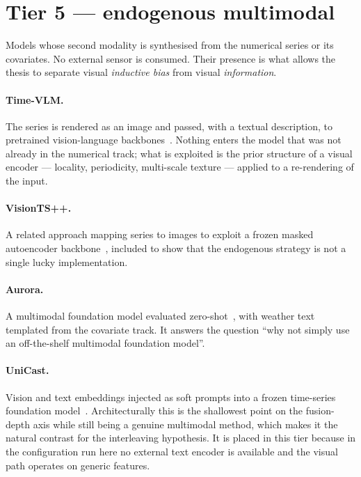 \section{Tier 5 --- endogenous multimodal}
\label{sec:tier5}

Models whose second modality is synthesised from the numerical series or its covariates. No
external sensor is consumed. Their presence is what allows the thesis to separate visual
\emph{inductive bias} from visual \emph{information}.

\paragraph{Time-VLM.} The series is rendered as an image and passed, with a textual
description, to pretrained vision-language backbones~\cite{timevlm}. Nothing enters the
model that was not already in the numerical track; what is exploited is the prior structure
of a visual encoder --- locality, periodicity, multi-scale texture --- applied to a
re-rendering of the input.

\paragraph{VisionTS++.} A related approach mapping series to images to exploit a frozen
masked autoencoder backbone~\cite{visiontspp}, included to show that the endogenous strategy
is not a single lucky implementation.

\paragraph{Aurora.} A multimodal foundation model evaluated zero-shot~\cite{aurora}, with
weather text templated from the covariate track. It answers the question ``why not simply use
an off-the-shelf multimodal foundation model''.

\paragraph{UniCast.} Vision and text embeddings injected as soft prompts into a frozen
time-series foundation model~\cite{unicast}. Architecturally this is the shallowest point on
the fusion-depth axis while still being a genuine multimodal method, which makes it the
natural contrast for the interleaving hypothesis. It is placed in this tier because in the
configuration run here no external text encoder is available and the visual path operates on
generic features.

